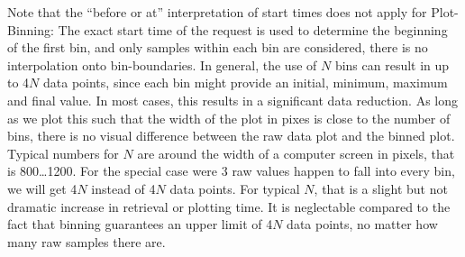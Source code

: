 Note that the ``before or at'' interpretation of start times does not
apply for Plot-Binning: The exact start time of the request is used
to determine the beginning of the first bin, and only samples within
each bin are considered, there is no interpolation onto bin-boundaries.
In general, the use of $N$ bins can result in up to 4$N$ data points,
since each bin might provide an initial, minimum, maximum and final value.
In most cases, this results in a significant data
reduction. As long as we plot this such that the width of the plot in
pixes is close to the number of bins, there is no visual difference
between the raw data plot and the binned plot.  Typical numbers for
$N$ are around the width of a computer screen in pixels, that is
800\ldots 1200.  For the special case were 3 raw values happen to fall
into every bin, we will get 4$N$ instead of 4$N$ data points. For
typical $N$, that is a slight but not dramatic increase in retrieval
or plotting time. It is neglectable compared to the fact that binning
guarantees an upper limit of 4$N$ data points, no matter how many raw
samples there are.
